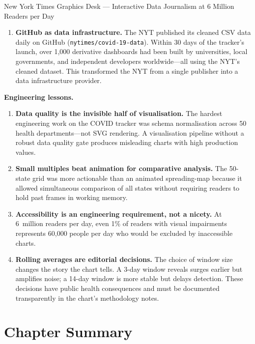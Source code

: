 \begin{casestudy}{New York Times Graphics Desk --- Interactive Data
Journalism at 6 Million Readers per Day}
\begin{enumerate}
  \item \textbf{GitHub as data infrastructure.} The NYT published its
        cleaned CSV data daily on GitHub (\texttt{nytimes/covid-19-data}).
        Within 30 days of the tracker's launch, over 1{,}000 derivative
        dashboards had been built by universities, local governments,
        and independent developers worldwide---all using the NYT's
        cleaned dataset. This transformed the NYT from a single publisher
        into a data infrastructure provider.
\end{enumerate}

\medskip
\textbf{Engineering lessons.}
\begin{enumerate}
  \item \textbf{Data quality is the invisible half of visualisation.}
        The hardest engineering work on the COVID tracker was schema
        normalisation across 50 health departments---not SVG rendering.
        A visualisation pipeline without a robust data quality gate
        produces misleading charts with high production values.
  \item \textbf{Small multiples beat animation for comparative analysis.}
        The 50-state grid was more actionable than an animated spreading-map
        because it allowed simultaneous comparison of all states
        without requiring readers to hold past frames in working memory.
  \item \textbf{Accessibility is an engineering requirement, not a
        nicety.} At 6~million readers per day, even 1\% of readers
        with visual impairments represents 60{,}000 people per day who
        would be excluded by inaccessible charts.
  \item \textbf{Rolling averages are editorial decisions.}
        The choice of window size changes the story the chart tells.
        A 3-day window reveals surges earlier but amplifies noise;
        a 14-day window is more stable but delays detection. These
        decisions have public health consequences and must be documented
        transparently in the chart's methodology notes.
\end{enumerate}
\end{casestudy}

\section*{Chapter Summary}
\label{sec:ch9-summary}

